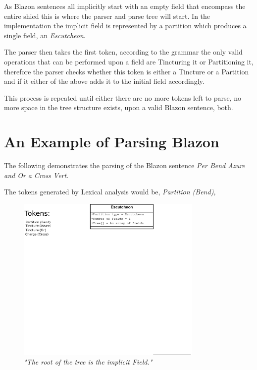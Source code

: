 As Blazon sentences all implicitly start with an empty field that encompass the entire shied this is where the parser and parse tree will start.  In the implementation the implicit field is represented by a partition which produces a single field,  an \emph{Escutcheon}. 

The parser then takes the first token, according to the grammar the only valid operations that can be performed upon a field are Tincturing it or Partitioning it, therefore the parser checks whether this token is either a Tincture or a Partition and if it either of the above adds it to the initial field accordingly.  

This process is repeated until either there are no more tokens left to parse, no more space in the tree structure exists, upon a valid Blazon sentence, both. 



\section{An Example of Parsing Blazon}


The following demonstrates the parsing of the Blazon sentence \emph{Per Bend Azure and Or a Cross Vert}.  

The tokens generated by Lexical analysis would be, \emph{Partition (Bend), }


\begin{figure}[H]
  \centering
    \includegraphics[width=0.8\textwidth]{parsing/images/Parsing5.eps}
  \caption{\emph{"The root of the tree is the implicit Field."}}
  
\end{figure}


